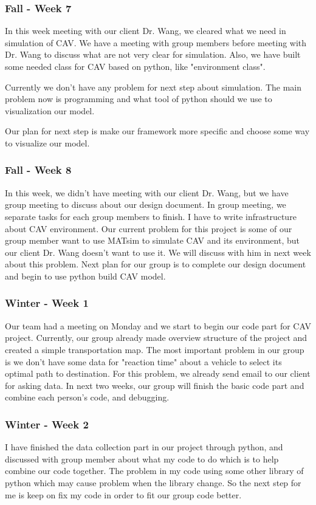 \documentclass[onecolumn, draftclsnofoot,10pt, compsoc]{IEEEtran}
\begin{document}
\subsubsection{Fall - Week 7}
In this week meeting with our client Dr. Wang, we cleared what we need in simulation of CAV.
We have a meeting with group members before meeting with Dr. Wang to discuss what are not very clear for simulation.
Also, we have built some needed class for CAV based on python, like "environment class".

Currently we don't have any problem for next step about simulation.
The main problem now is programming and what tool of python should we use to visualization our model.

Our plan for next step is make our framework more specific and choose some way to visualize our model.
\subsubsection{Fall - Week 8}
In this week, we didn't have meeting with our client Dr. Wang, but we have group meeting to discuss about our design document.
In group meeting, we separate tasks for each group members to finish.
I have to write infrastructure about CAV environment.
Our current problem for this project is some of our group member want to use MATsim to simulate CAV and its environment, but our client Dr. Wang doesn't want to use it.
We will discuss with him in next week about this problem.
Next plan for our group is to complete our design document and begin to use python build CAV model.
\subsubsection{Winter - Week 1}
Our team had a meeting on Monday and we start to begin our code part for CAV project.
Currently, our group already made overview structure of the project and created a simple transportation map.
The most important problem in our group is we don't have some data for "reaction time" about a vehicle to select its optimal path to destination.
For this problem, we already send email to our client for asking data.
In next two weeks, our group will finish the basic code part and combine each person's code, and debugging.
\subsubsection{Winter - Week 2}
I have finished the data collection part in our project through python, and discussed with group member about what my code to do which is to help combine our code together.
The problem in my code using some other library of python which may cause problem when the library change.
So the next step for me is keep on fix my code in order to fit our group code better.
\end{document}
